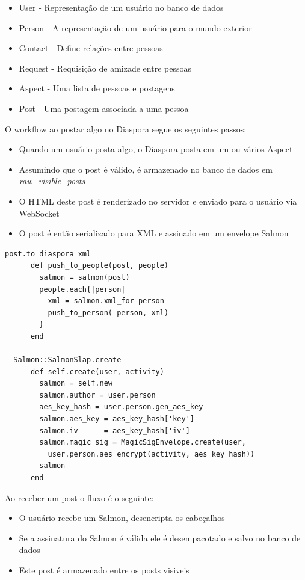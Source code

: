 \documentclass[12pt]{article}
\begin{document}
\begin{itemize}
  \item User - Representação de um usuário no banco de dados
  \item Person - A representação de um usuário para o mundo exterior
  \item Contact - Define relações entre pessoas
  \item Request - Requisição de amizade entre pessoas
  \item Aspect - Uma lista de pessoas e postagens
  \item Post - Uma postagem associada a uma pessoa
\end{itemize}

O workflow ao postar algo no Diaspora segue os seguintes passos:

\begin{itemize}
  \item Quando um usuário posta algo, o Diaspora posta em um ou vários Aspect
  \item Assumindo que o post é válido, é armazenado no banco de dados em {\it raw\_visible\_posts}
  \item O HTML deste post é renderizado no servidor e enviado para o usuário via WebSocket\cite{websocket}
  \item O post é então serializado para XML e assinado em um envelope Salmon
\end{itemize}

\begin{framed}
\begin{lstlisting}[caption=Exemplo envio de mensagem e como o Diaspora serializa em XML]
  post.to_diaspora_xml
      def push_to_people(post, people)
        salmon = salmon(post)
        people.each{|person|
          xml = salmon.xml_for person
          push_to_person( person, xml)
        }
      end
  
  Salmon::SalmonSlap.create
      def self.create(user, activity)
        salmon = self.new
        salmon.author = user.person
        aes_key_hash = user.person.gen_aes_key
        salmon.aes_key = aes_key_hash['key']
        salmon.iv      = aes_key_hash['iv']
        salmon.magic_sig = MagicSigEnvelope.create(user,
          user.person.aes_encrypt(activity, aes_key_hash))
        salmon
      end
\end{lstlisting}
\end{framed}

Ao receber um post o fluxo é o seguinte:

\begin{itemize}
  \item O usuário recebe um Salmon, desencripta os cabeçalhos
  \item Se a assinatura do Salmon é válida ele é desempacotado e salvo no banco de dados
  \item Este post é armazenado entre os posts visiveis
\end{itemize}
\end{document}
